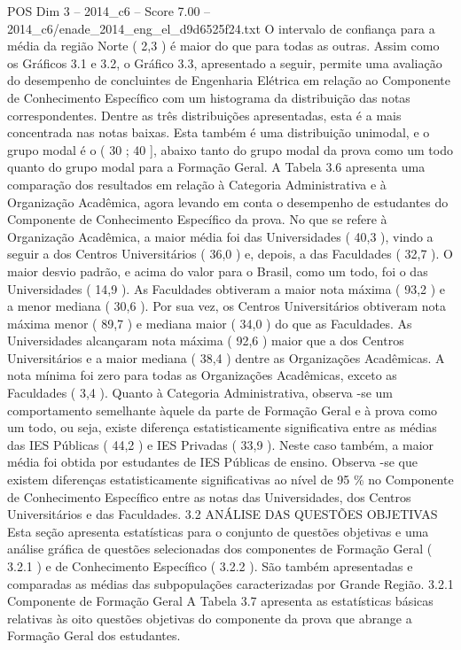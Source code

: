 \begin{textsample}{POS Dim 3 – 2014\_c6 – Score 7.00 – 2014\_c6/enade\_2014\_eng\_el\_d9d6525f24.txt}
O intervalo de confiança para a média da região Norte ( 2,3 ) é maior do que para todas as outras.
Assim como os Gráficos 3.1 e 3.2, o Gráfico 3.3, apresentado a seguir, permite uma avaliação do desempenho de concluintes de Engenharia Elétrica em relação ao Componente de Conhecimento Específico com um histograma da distribuição das notas correspondentes.
Dentre as três distribuições apresentadas, esta é a mais concentrada nas notas baixas.
Esta também é uma distribuição unimodal, e o grupo modal é o ( 30 ; 40 ], abaixo tanto do grupo modal da prova como um todo quanto do grupo modal para a Formação Geral.
A Tabela 3.6 apresenta uma comparação dos resultados em relação à Categoria Administrativa e à Organização Acadêmica, agora levando em conta o desempenho de estudantes do Componente de Conhecimento Específico da prova.
No que se refere à Organização Acadêmica, a maior média foi das Universidades ( 40,3 ), vindo a seguir a dos Centros Universitários ( 36,0 ) e, depois, a das Faculdades ( 32,7 ).
O maior desvio padrão, e acima do valor para o Brasil, como um todo, foi o das Universidades ( 14,9 ).
As Faculdades obtiveram a maior nota máxima ( 93,2 ) e a menor mediana ( 30,6 ).
Por sua vez, os Centros Universitários obtiveram nota máxima menor ( 89,7 ) e mediana maior ( 34,0 ) do que as Faculdades.
As Universidades alcançaram nota máxima ( 92,6 ) maior que a dos Centros Universitários e a maior mediana ( 38,4 ) dentre as Organizações Acadêmicas.
A nota mínima foi zero para todas as Organizações Acadêmicas, exceto as Faculdades ( 3,4 ).
Quanto à Categoria Administrativa, observa -se um comportamento semelhante àquele da parte de Formação Geral e à prova como um todo, ou seja, existe diferença estatisticamente significativa entre as médias das IES Públicas ( 44,2 ) e IES Privadas ( 33,9 ).
Neste caso também, a maior média foi obtida por estudantes de IES Públicas de ensino.
Observa -se que existem diferenças estatisticamente significativas ao nível de 95 \% no Componente de Conhecimento Específico entre as notas das Universidades, dos Centros Universitários e das Faculdades. 3.2 ANÁLISE DAS QUESTÕES OBJETIVAS Esta seção apresenta estatísticas para o conjunto de questões objetivas e uma análise gráfica de questões selecionadas dos componentes de Formação Geral ( 3.2.1 ) e de Conhecimento Específico ( 3.2.2 ).
São também apresentadas e comparadas as médias das subpopulações caracterizadas por Grande Região. 3.2.1 Componente de Formação Geral A Tabela 3.7 apresenta as estatísticas básicas relativas às oito questões objetivas do componente da prova que abrange a Formação Geral dos estudantes.

\end{textsample}
